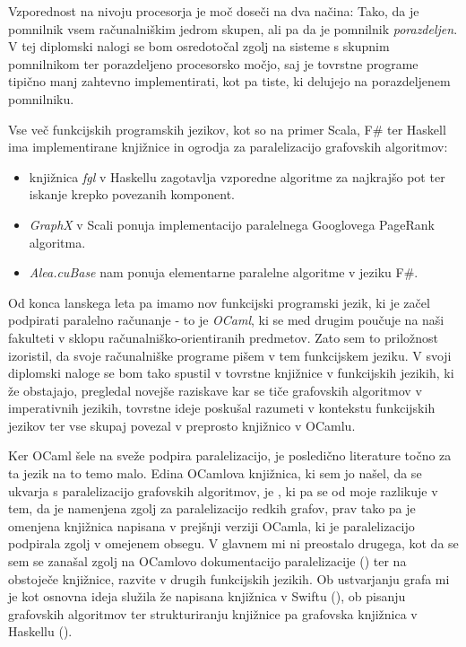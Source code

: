 \documentclass[mat1, tisk]{fmfdelo}
\begin{document}
Vzporednost na nivoju procesorja je moč doseči na dva načina: 
Tako, da je pomnilnik vsem računalniškim jedrom skupen, ali pa da je pomnilnik \textit{porazdeljen}. 
V tej diplomski nalogi se bom osredotočal zgolj na sisteme s skupnim pomnilnikom ter porazdeljeno procesorsko močjo, 
saj je tovrstne programe tipično manj zahtevno implementirati, kot pa tiste, ki delujejo na porazdeljenem pomnilniku.

Vse več funkcijskih programskih jezikov, kot so na primer Scala, F\# ter Haskell ima implementirane knjižnice
in ogrodja za paralelizacijo grafovskih algoritmov:
\begin{itemize}
    \item knjižnica \textit{fgl} v Haskellu zagotavlja vzporedne algoritme za najkrajšo pot 
    ter iskanje krepko povezanih komponent.
    \item \textit{GraphX} v Scali ponuja implementacijo paralelnega Googlovega PageRank algoritma.
    \item \textit{Alea.cuBase} nam ponuja elementarne paralelne algoritme v jeziku F\#.
\end{itemize}

Od konca lanskega leta pa imamo nov funkcijski programski jezik, ki je začel podpirati paralelno računanje - to je \textit{OCaml},
ki se med drugim poučuje na naši fakulteti v sklopu računalniško-orientiranih predmetov. 
Zato sem to priložnost izoristil, da svoje računalniške programe pišem v tem funkcijskem jeziku. 
V svoji diplomski naloge se bom tako spustil v tovrstne knjižnice v funkcijskih jezikih, ki že obstajajo, 
pregledal novejše raziskave kar se tiče grafovskih algoritmov v imperativnih jezikih, 
tovrstne ideje poskušal razumeti v kontekstu funkcijskih jezikov ter vse skupaj povezal v preprosto knjižnico v OCamlu.

Ker OCaml šele na sveže podpira paralelizacijo, je posledično literature točno za ta jezik na to temo malo. 
Edina OCamlova knjižnica, ki sem jo našel, da se ukvarja s paralelizacijo grafovskih algoritmov, je \cite{ocaml_multicore_500},
ki pa se od moje razlikuje v tem, da je namenjena zgolj za paralelizacijo redkih grafov, prav tako pa je omenjena knjižnica napisana
v prejšnji verziji OCamla, ki je paralelizacijo podpirala zgolj v omejenem obsegu. V glavnem mi ni preostalo drugega,
kot da se sem se zanašal zgolj na OCamlovo dokumentacijo paralelizacije (\cite{ocaml_paralelisation_documentation}) ter
na obstoječe knjižnice, razvite v drugih funkcijskih jezikih. Ob ustvarjanju grafa mi je kot osnovna ideja
služila že napisana knjižnica v Swiftu (\cite{functional_swift_graph}), ob pisanju grafovskih algoritmov ter
strukturiranju knjižnice pa grafovska knjižnica v Haskellu (\cite{haskell_fgl}).
\end{document}
